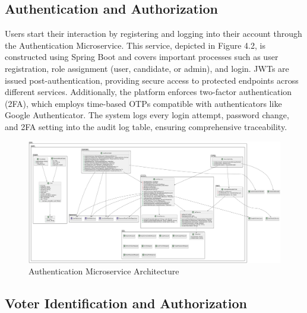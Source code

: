 \documentclass[a4paper,10pt]{report}
\begin{document}
 \subsection{Authentication and Authorization}

Users start their interaction by registering and logging into their account through the Authentication Microservice.  This service, depicted in Figure 4.2, is constructed using Spring Boot and covers important processes such as user registration, role assignment (user, candidate, or admin), and login.  JWTs are issued post-authentication, providing secure access to protected endpoints across different services.  Additionally, the platform enforces two-factor authentication (2FA), which employs time-based OTPs compatible with authenticators like Google Authenticator.  The system logs every login attempt, password change, and 2FA setting into the audit log table, ensuring comprehensive traceability.
\begin{figure}[htbp]
  \centering
  \includegraphics[width=1.0\textwidth]{authMicroservice.png}
  \caption{Authentication Microservice Architecture}
  \label{fig:full}
\end{figure}

  \subsection{Voter Identification and Authorization}
\end{document}
